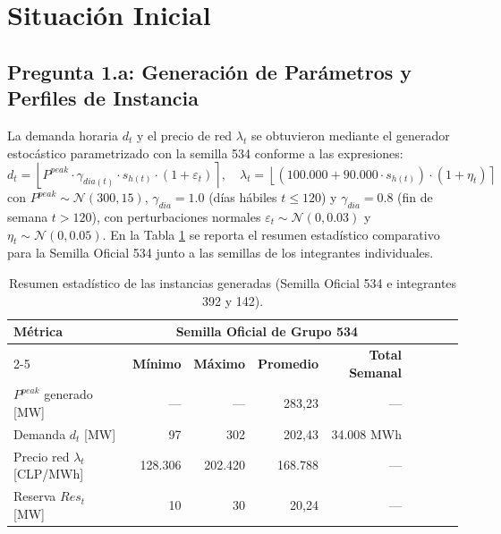 \documentclass[10pt,letterpaper]{article}
\begin{document}
\section{Situación Inicial}
\label{sec:situacion_inicial}

\subsection{Pregunta 1.a: Generación de Parámetros y Perfiles de Instancia}
\label{subsec:1a}

La demanda horaria $d_t$ y el precio de red $\lambda_t$ se obtuvieron mediante el generador estocástico parametrizado con la semilla 534 conforme a las expresiones:
\begin{equation}
    d_t = \left\lfloor P^{peak} \cdot \gamma_{dia(t)} \cdot s_{h(t)} \cdot (1 + \varepsilon_t) \right\rceil, \quad 
    \lambda_t = \left\lfloor (100.000 + 90.000 \cdot s_{h(t)}) \cdot (1 + \eta_t) \right\rceil
\end{equation}
con $P^{peak} \sim \mathcal{N}(300, 15)$, $\gamma_{dia} = 1.0$ (días hábiles $t \le 120$) y $\gamma_{dia} = 0.8$ (fin de semana $t > 120$), con perturbaciones normales $\varepsilon_t \sim \mathcal{N}(0, 0.03)$ y $\eta_t \sim \mathcal{N}(0, 0.05)$. En la Tabla \ref{tab:estadisticas_instancia} se reporta el resumen estadístico comparativo para la Semilla Oficial 534 junto a las semillas de los integrantes individuales.

\begin{table}[H]
\centering
\caption{Resumen estadístico de las instancias generadas (Semilla Oficial 534 e integrantes 392 y 142).}
\label{tab:estadisticas_instancia}
\setlength{\tabcolsep}{3.5pt}
\small
\begin{tabular}{lrrrrrrrr}
\toprule
\textbf{Métrica} & \multicolumn{4}{c}{\textbf{Semilla Oficial de Grupo 534}}\\
\cmidrule(lr){2-5}
& \textbf{Mínimo} & \textbf{Máximo} & \textbf{Promedio} & \textbf{Total Semanal}\\
\midrule
$P^{peak}$ generado [MW] & --- & --- & 283,23 & --- \\
Demanda $d_t$ [MW] & 97 & 302 & 202,43 & 34.008 MWh \\
Precio red $\lambda_t$ [CLP/MWh] & 128.306 & 202.420 & 168.788 & --- \\
Reserva $Res_t$ [MW] & 10 & 30 & 20,24 & --- \\
\bottomrule
\end{tabular}
\end{table}
\end{document}
